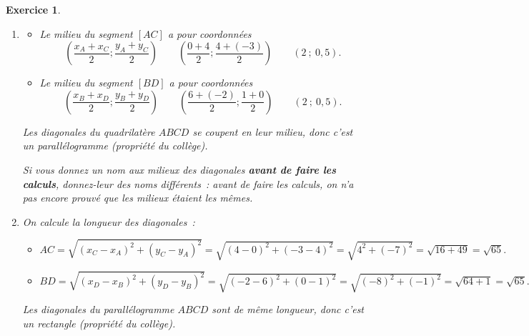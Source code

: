\documentclass[10pt]{article}
\newtheorem{exo}{Exercice}
\begin{document}
\begin{exo}
\begin{enumerate}
\item \begin{itemize}
\item[\textbullet] Le milieu du segment $\left[AC\right]$ a pour coordonnées
\[\left(\frac{x_A+x_C}{2};\frac{y_A+y_C}{2}\right)\qquad \left(\frac{0+4}{2};\frac{4+(-3)}{2}\right)\qquad \left(2~;~0,5\right).\]
\item[\textbullet] Le milieu du segment $\left[BD\right]$ a pour coordonnées
\[\left(\frac{x_B+x_D}{2};\frac{y_B+y_D}{2}\right)\qquad \left(\frac{6+(-2)}{2};\frac{1+0}{2}\right)\qquad \left(2~;~0,5\right).\]
\end{itemize}
Les diagonales du quadrilatère $ABCD$ se coupent en leur milieu, donc c'est un parallélogramme (propriété du collège).

\medskip

\danger Si vous donnez un nom aux milieux des diagonales \textbf{avant de faire les calculs}, donnez-leur des noms différents~: avant de faire les calculs, on n'a pas encore prouvé que les milieux étaient les mêmes.
\item On calcule la longueur des diagonales~:

\begin{itemize}
\item[\textbullet] $AC=\sqrt{\left(x_C-x_A\right)^2+\left(y_C-y_A\right)^2}
= \sqrt{(4-0)^2+(-3-4)^2}
=\sqrt{4^2+(-7)^2}
=\sqrt{16+49}
=\sqrt{65}.$
\item[\textbullet] $BD=\sqrt{\left(x_D-x_B\right)^2+\left(y_D-y_B\right)^2}
= \sqrt{(-2-6)^2+(0-1)^2}
=\sqrt{(-8)^2+(-1)^2}
=\sqrt{64+1}
=\sqrt{65}.$
\end{itemize}
Les diagonales du parallélogramme $ABCD$ sont de même longueur, donc c'est un rectangle (propriété du collège).
\end{enumerate}

\end{exo}
\end{document}
